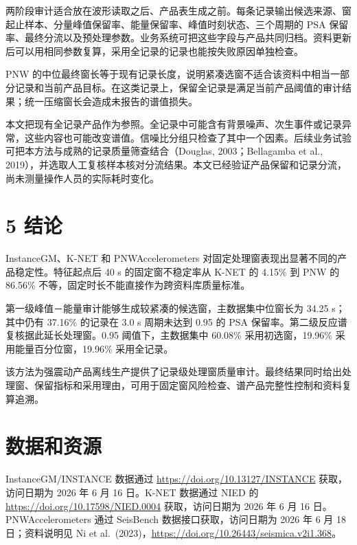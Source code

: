\documentclass[UTF8,a4paper,zihao=5]{ctexart}
\begin{document}
两阶段审计适合放在波形读取之后、产品表生成之前。每条记录输出候选来源、窗起止样本、分量峰值保留率、能量保留率、峰值时刻状态、三个周期的 PSA 保留率、最终分流以及预处理参数。业务系统可把这些字段与产品共同归档。资料更新后可以用相同参数复算，采用全记录的记录也能按失败原因单独检查。

PNW 的中位最终窗长等于现有记录长度，说明紧凑选窗不适合该资料中相当一部分记录和当前产品目标。在这类记录上，保留全记录是满足当前产品阈值的审计结果；统一压缩窗长会造成未报告的谱值损失。

本文把现有全记录产品作为参照。全记录中可能含有背景噪声、次生事件或记录异常，这些内容也可能改变谱值。信噪比分组只检查了其中一个因素。后续业务试验可把本方法与成熟的记录质量筛查结合（Douglas, 2003；Bellagamba et al., 2019），并选取人工复核样本核对分流结果。本文已经验证产品保留和记录分流，尚未测量操作人员的实际耗时变化。

\section*{5 结论}\label{ux7ed3ux8bba}

InstanceGM、K-NET 和 PNWAccelerometers 对固定处理窗表现出显著不同的产品稳定性。特征起点后 40 s 的固定窗不稳定率从 K-NET 的 4.15\% 到 PNW 的 86.56\% 不等，固定时长不能直接作为跨资料库质量标准。

第一级峰值－能量审计能够生成较紧凑的候选窗，主数据集中位窗长为 34.25 s；其中仍有 37.16\% 的记录在 3.0 s 周期未达到 0.95 的 PSA 保留率。第二级反应谱复核据此延长处理窗。0.95 阈值下，主数据集中 60.08\% 采用初选窗，19.96\% 采用能量百分位窗，19.96\% 采用全记录。

该方法为强震动产品离线生产提供了记录级处理窗质量审计。最终结果同时给出处理窗、保留指标和采用理由，可用于固定窗风险检查、谱产品完整性控制和资料复算追溯。

\section*{数据和资源}\label{ux6570ux636eux548cux8d44ux6e90}

InstanceGM/INSTANCE 数据通过 \url{https://doi.org/10.13127/INSTANCE} 获取，访问日期为 2026 年 6 月 16 日。K-NET 数据通过 NIED 的 \url{https://doi.org/10.17598/NIED.0004} 获取，访问日期为 2026 年 6 月 16 日。PNWAccelerometers 通过 SeisBench 数据接口获取，访问日期为 2026 年 6 月 18 日；资料说明见 Ni et al.~(2023)，\url{https://doi.org/10.26443/seismica.v2i1.368}。
\end{document}
